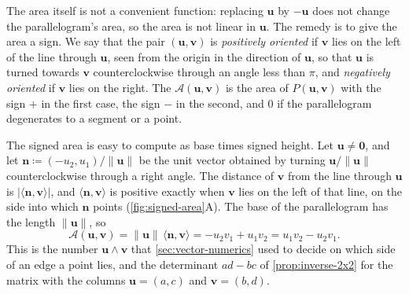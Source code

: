 The area itself is not a convenient function: replacing $\mathbf u$ by $-\mathbf u$ does not change the parallelogram's area, so the area is not linear in $\mathbf u$. The remedy is to give the area a sign. We say that the pair $(\mathbf u,\mathbf v)$ is \emph{positively oriented} if $\mathbf v$ lies on the left of the line through $\mathbf u$, seen from the origin in the direction of $\mathbf u$, so that $\mathbf u$ is turned towards $\mathbf v$ counterclockwise through an angle less than $\pi$, and \emph{negatively oriented} if $\mathbf v$ lies on the right. The  $\mathcal A(\mathbf u,\mathbf v)$ is the area of $P(\mathbf u,\mathbf v)$ with the sign $+$ in the first case, the sign $-$ in the second, and $0$ if the parallelogram degenerates to a segment or a point.

The signed area is easy to compute as base times signed height. Let $\mathbf u\ne\mathbf 0$, and let $\mathbf n\coloneqq(-u_2,u_1)/\|\mathbf u\|$ be the unit vector obtained by turning $\mathbf u/\|\mathbf u\|$ counterclockwise through a right angle. The distance of $\mathbf v$ from the line through $\mathbf u$ is $|\langle\mathbf n,\mathbf v\rangle|$, and $\langle\mathbf n,\mathbf v\rangle$ is positive exactly when $\mathbf v$ lies on the left of that line, on the side into which $\mathbf n$ points (\cref{fig:signed-area}A). The base of the parallelogram has the length $\|\mathbf u\|$, so
\begin{equation}
\mathcal A(\mathbf u,\mathbf v)=\|\mathbf u\|\,\langle\mathbf n,\mathbf v\rangle=-u_2v_1+u_1v_2=u_1v_2-u_2v_1 .
\label{eq:signed-area}
\end{equation}
This is the number $\mathbf u\wedge\mathbf v$ that \cref{sec:vector-numerics} used to decide on which side of an edge a point lies, and the determinant $ad-bc$ of \cref{prop:inverse-2x2} for the matrix with the columns $\mathbf u=(a,c)$ and $\mathbf v=(b,d)$.

